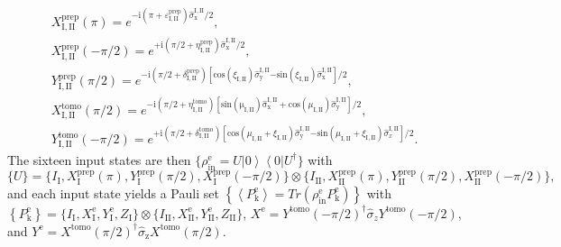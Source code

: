 \[
\begin{array}{c}
X_{\mathrm{I,II}}^{\mathrm{prep}}(\pi)=e^{-\mathrm{i}\left(\pi+\varepsilon_{\mathrm{I,II}}^{\mathrm{prep}}\right)\hat{\sigma}_{\mathrm{x}}^{\mathrm{I,II}}/2},\\
X_{\mathrm{I,II}}^{\mathrm{prep}}(-\pi/2)=e^{+\mathrm{i}\left(\pi/2+\eta_{\mathrm{I,II}}^{\mathrm{prep}}\right)\hat{\sigma}_{\mathrm{x}}^{\mathrm{I,II}}/2},\\
Y_{\mathrm{I,II}}^{\mathrm{prep}}(\pi/2)=e^{-\mathrm{i}\left(\pi/2+\delta_{\mathrm{I,II}}^{\mathrm{prep}}\right)\left[\mathrm{cos}\left(\xi_{\mathrm{I,II}}\right)\hat{\sigma}_{\mathrm{y}}^{\mathrm{I,II}}\mathrm{-sin}\left(\xi_{\mathrm{I,II}}\right)\hat{\sigma}_{\mathrm{x}}^{\mathrm{I,II}}\right]/2},\\
X_{\mathrm{I,II}}^{\mathrm{tomo}}(\pi/2)=e^{-\mathrm{i}\left(\pi/2+\eta_{\mathrm{I,II}}^{\mathrm{tomo}}\right)\left[\mathrm{\mathrm{sin}\left(\mu_{I,II}\right)\hat{\sigma}_{x}^{I,II}+cos}\left(\mu_{\mathrm{I,II}}\right)\hat{\sigma}_{\mathrm{y}}^{\mathrm{I,II}}\right]/2},\\
Y_{\mathrm{I,II}}^{\mathrm{tomo}}(-\pi/2)=e^{+\mathrm{i}\left(\pi/2+\delta_{\mathrm{I,II}}^{\mathrm{tomo}}\right)\left[\mathrm{cos}\left(\mu_{\mathrm{I,II}}+\xi_{\mathrm{I,II}}\right)\hat{\sigma}_{\mathrm{y}}^{\mathrm{I,II}}\mathrm{-sin}\left(\mu_{\mathrm{I,II}}+\xi_{\mathrm{I,II}}\right)\hat{\sigma}_{x}^{\mathrm{I,II}}\right]/2}.\end{array}\]
The sixteen input states are then $\{ \rho_{\mathrm{in}}^{\mathrm{e}}=U\left|0\right\rangle \left\langle 0\right|U^{\dagger}\} $
with 
%
\begin{equation}
\{ U\} =\{I_{\mathrm{I}}, X_{\mathrm{I}}^{\mathrm{prep}}(\pi), Y_{\mathrm{I}}^{\mathrm{prep}}(\pi/2),X_{\mathrm{I}}^{\mathrm{prep}}(-\pi/2)\}\otimes\{I_{\mathrm{II}},X_{\mathrm{II}}^{\mathrm{prep}}(\pi),Y_{\mathrm{II}}^{\mathrm{prep}}(\pi/2),X_{\mathrm{II}}^{\mathrm{prep}}(-\pi/2)\},
\end{equation}
%
and each input state yields a Pauli set $\left\{ \left\langle P_{\mathrm{k}}^{\mathrm{e}}\right\rangle =Tr\left(\rho_{\mathrm{in}}^{\mathrm{e}}P_{\mathrm{k}}^{\mathrm{e}}\right)\right\} $
with $\left\{ P_{\mathrm{k}}^{\mathrm{e}}\right\} =\{I_{\mathrm{I}},X_{\mathrm{I}}^{\mathrm{e}},Y_{\mathrm{I}}^{\mathrm{e}},Z_{\mathrm{I}}\}\otimes\{I_{\mathrm{II}},X_{\mathrm{II}}^{\mathrm{e}},Y_{\mathrm{II}}^{\mathrm{e}},Z_{\mathrm{II}}\}$,
$X^{\mathrm{e}}=Y^{\mathrm{tomo}}(-\pi/2)^{\dagger}\hat{\sigma}_{z}Y^{\mathrm{tomo}}(-\pi/2)$,
and $Y^{\mathrm{e}}=X^{\mathrm{tomo}}(\pi/2)^{\dagger}\hat{\sigma}_{\mathrm{z}}X^{\mathrm{tomo}}(\pi/2)$.

